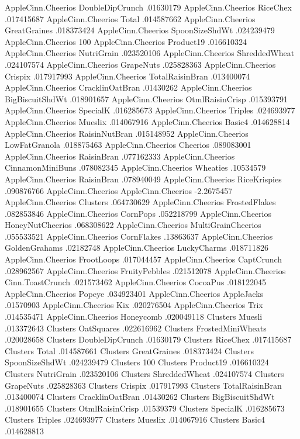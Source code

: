 AppleCinn.Cheerios	DoubleDipCrunch	.01630179
AppleCinn.Cheerios	RiceChex	.017415687
AppleCinn.Cheerios	Total	.014587662
AppleCinn.Cheerios	GreatGraines	.018373424
AppleCinn.Cheerios	SpoonSizeShdWt	.024239479
AppleCinn.Cheerios	100%
AppleCinn.Cheerios	Product19	.016610324
AppleCinn.Cheerios	NutriGrain	.023520106
AppleCinn.Cheerios	ShreddedWheat	.024107574
AppleCinn.Cheerios	GrapeNuts	.025828363
AppleCinn.Cheerios	Crispix	.017917993
AppleCinn.Cheerios	TotalRaisinBran	.013400074
AppleCinn.Cheerios	CracklinOatBran	.01430262
AppleCinn.Cheerios	BigBiscuitShdWt	.018901657
AppleCinn.Cheerios	OtmlRaisinCrisp	.015393791
AppleCinn.Cheerios	SpecialK	.016285673
AppleCinn.Cheerios	Triples	.024693977
AppleCinn.Cheerios	Mueslix	.014067916
AppleCinn.Cheerios	Basic4	.014628814
AppleCinn.Cheerios	RaisinNutBran	.015148952
AppleCinn.Cheerios	LowFatGranola	.018875463
AppleCinn.Cheerios	Cheerios	.089083001
AppleCinn.Cheerios	RaisinBran	.077162333
AppleCinn.Cheerios	CinnamonMiniBuns	.078082345
AppleCinn.Cheerios	Wheaties	.10534579
AppleCinn.Cheerios	RaisinBran	.078940049
AppleCinn.Cheerios	RiceKrispies	.090876766
AppleCinn.Cheerios	AppleCinn.Cheerios	-2.2675457
AppleCinn.Cheerios	Clusters	.064730629
AppleCinn.Cheerios	FrostedFlakes	.082853846
AppleCinn.Cheerios	CornPops	.052218799
AppleCinn.Cheerios	HoneyNutCheerios	.068308622
AppleCinn.Cheerios	MultiGrainCheerios	.055533521
AppleCinn.Cheerios	CornFlakes	.13863637
AppleCinn.Cheerios	GoldenGrahams	.02182748
AppleCinn.Cheerios	LuckyCharms	.018711826
AppleCinn.Cheerios	FrootLoops	.017044457
AppleCinn.Cheerios	CaptCrunch	.028962567
AppleCinn.Cheerios	FruityPebbles	.021512078
AppleCinn.Cheerios	Cinn.ToastCrunch	.021573462
AppleCinn.Cheerios	CocoaPus	.018122045
AppleCinn.Cheerios	Popeye	.034923401
AppleCinn.Cheerios	AppleJacks	.01570903
AppleCinn.Cheerios	Kix	.020276504
AppleCinn.Cheerios	Trix	.014535471
AppleCinn.Cheerios	Honeycomb	.020049118
Clusters	Muesli	.013372643
Clusters	OatSquares	.022616962
Clusters	FrostedMiniWheats	.020028658
Clusters	DoubleDipCrunch	.01630179
Clusters	RiceChex	.017415687
Clusters	Total	.014587661
Clusters	GreatGraines	.018373424
Clusters	SpoonSizeShdWt	.024239479
Clusters	100%
Clusters	Product19	.016610324
Clusters	NutriGrain	.023520106
Clusters	ShreddedWheat	.024107574
Clusters	GrapeNuts	.025828363
Clusters	Crispix	.017917993
Clusters	TotalRaisinBran	.013400074
Clusters	CracklinOatBran	.01430262
Clusters	BigBiscuitShdWt	.018901655
Clusters	OtmlRaisinCrisp	.01539379
Clusters	SpecialK	.016285673
Clusters	Triples	.024693977
Clusters	Mueslix	.014067916
Clusters	Basic4	.014628813
